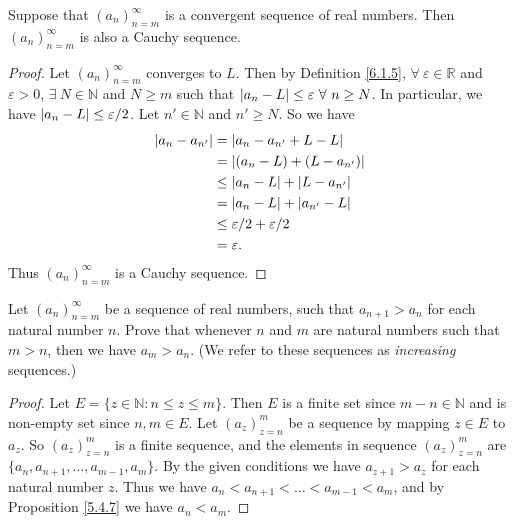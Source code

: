\begin{proposition}\label{6.1.12}
Suppose that \((a_n)_{n = m}^\infty\) is a convergent sequence of real numbers.
Then \((a_n)_{n = m}^\infty\) is also a Cauchy sequence.
\end{proposition}

\begin{proof}
Let \((a_n)_{n = m}^\infty\) converges to \(L\).
Then by Definition \ref{6.1.5}, \(\forall\ \varepsilon \in \mathds{R}\) and \(\varepsilon > 0\), \(\exists\ N \in \mathds{N}\) and \(N \geq m\) such that \(\abs*{a_n - L} \leq \varepsilon \ \forall\ n \geq N\).
In particular, we have \(\abs*{a_n - L} \leq \varepsilon / 2\).
Let \(n' \in \mathds{N}\) and \(n' \geq N\).
So we have
\begin{align*}
\abs*{a_n - a_{n'}} &= \abs*{a_n - a_{n'} + L - L} \\
&= \abs*{(a_n - L) + (L - a_{n'})} \\
&\leq \abs*{a_n - L} + \abs*{L - a_{n'}} \\
&= \abs*{a_n - L} + \abs*{a_{n'} - L} \\
&\leq \varepsilon / 2 + \varepsilon / 2 \\
&= \varepsilon.
\end{align*}
Thus \((a_n)_{n = m}^\infty\) is a Cauchy sequence.
\end{proof}

\exercisesection

\begin{exercise}\label{ex 6.1.1}
Let \((a_n)_{n = m}^\infty\) be a sequence of real numbers, such that \(a_{n + 1} > a_n\) for each natural number \(n\).
Prove that whenever \(n\) and \(m\) are natural numbers such that \(m > n\), then we have \(a_m > a_n\).
(We refer to these sequences as \emph{increasing} sequences.)
\end{exercise}

\begin{proof}
Let \(E = \{z \in \mathds{N} : n \leq z \leq m\}\).
Then \(E\) is a finite set since \(m - n \in \mathds{N}\) and is non-empty set since \(n, m \in E\).
Let \((a_z)_{z = n}^m\) be a sequence by mapping \(z \in E\) to \(a_z\).
So \((a_z)_{z = n}^m\) is a finite sequence, and the elements in sequence \((a_z)_{z = n}^m\) are \(\{a_n, a_{n + 1}, \dots, a_{m - 1}, a_m\}\).
By the given conditions we have \(a_{z + 1} > a_z\) for each natural number \(z\).
Thus we have \(a_n < a_{n + 1} < \dots < a_{m - 1} < a_m\), and by Proposition \ref{5.4.7} we have \(a_n < a_m\).
\end{proof}

